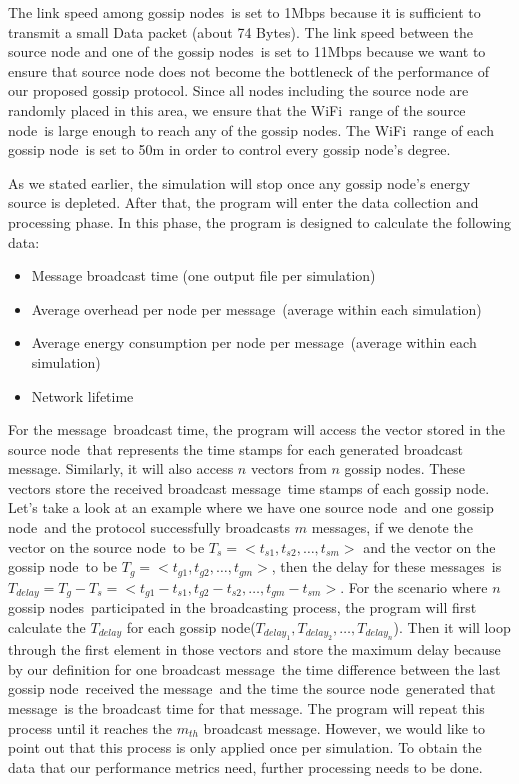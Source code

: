 \documentclass[onehalf,11pt]{beavtex}
\newcommand{\gp}{gossip protocol}
\newcommand{\msgs}{messages}
\newcommand{\msg}{message}
\newcommand{\gn}{gossip node}
\newcommand{\gns}{gossip nodes}
\newcommand{\wf}{WiFi}
\newcommand{\sn}{source node}
\begin{document}
The link speed among \gns ~is set to 1Mbps because it is sufficient to transmit a small Data packet (about 74 Bytes). The link speed between the source node and one of the \gns ~is set to 11Mbps because we want to ensure that source node does not become the bottleneck of the performance of our proposed \gp. Since all nodes including the source node are randomly placed in this area, we ensure that the \wf ~range of the \sn ~is large enough to reach any of the \gns. The \wf ~range of each \gn ~is set to 50m in order to control every gossip node's degree. 

As we stated earlier, the simulation will stop once any \gn's energy source is depleted. After that, the program will enter the data collection and processing phase. In this phase, the program is designed to calculate the following data:

\begin{itemize}
	\item Message broadcast time (one output file per simulation)
	\item Average overhead per node per \msg ~(average within each simulation)
	\item Average energy consumption per node per \msg ~(average within each simulation)
	\item Network lifetime
\end{itemize}

For the \msg ~broadcast time, the program will access the vector stored in the \sn ~that represents the time stamps for each generated broadcast \msg. Similarly, it will also access $n$ vectors from $n$ \gns. These vectors store the received broadcast \msg ~time stamps of each \gn. Let's take a look at an example where we have one \sn ~and one \gn ~and the protocol successfully broadcasts $m$ \msgs, if we denote the vector on the \sn ~to be $T_s=<t_{s1}, t_{s2}, \ldots, t_{sm}>$ and the vector on the \gn ~to be $T_g=<t_{g1}, t_{g2}, \ldots, t_{gm}>$, then the delay for these \msgs ~is $T_{delay}= T_g - T_s = <t_{g1}-t_{s1}, t_{g2}-t_{s2}, \ldots, t_{gm}-t_{sm}>$. For the scenario where $n$ \gns ~participated in the broadcasting process, the program will first calculate the $T_{delay}$ for each \gn ($T_{delay_1},T_{delay_2},\ldots,T_{delay_n} $). Then it will loop through the first element in those vectors and store the maximum delay because by our definition for one broadcast \msg ~the time difference between the last \gn ~received the \msg ~and the time the \sn ~generated that \msg ~is the broadcast time for that \msg. The program will repeat this process until it reaches the $m_{th}$ broadcast \msg. However, we would like to point out that this process is only applied once per simulation. To obtain the data that our performance metrics need, further processing needs to be done.
\end{document}
